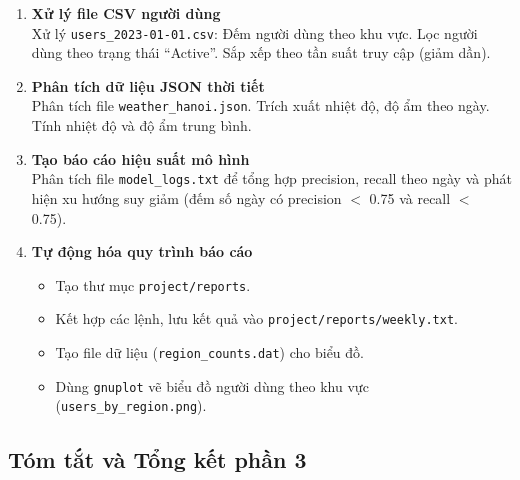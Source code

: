 \documentclass[11pt]{article}
\begin{document}
\begin{enumerate}
	\item \textbf{Xử lý file CSV người dùng}\\
	Xử lý \texttt{users\_2023-01-01.csv}: Đếm người dùng theo khu vực. Lọc người dùng theo trạng thái ``Active''. Sắp xếp theo tần suất truy cập (giảm dần).

	\item \textbf{Phân tích dữ liệu JSON thời tiết}\\
	Phân tích file \texttt{weather\_hanoi.json}. Trích xuất nhiệt độ, độ ẩm theo ngày. Tính nhiệt độ và độ ẩm trung bình.

	\item \textbf{Tạo báo cáo hiệu suất mô hình}\\
	Phân tích file \texttt{model\_logs.txt} để tổng hợp precision, recall theo ngày và phát hiện xu hướng suy giảm (đếm số ngày có precision $<$ 0.75 và recall $<$ 0.75).

	\item \textbf{Tự động hóa quy trình báo cáo}
	\begin{itemize}
		\item Tạo thư mục \texttt{project/reports}.
		\item Kết hợp các lệnh, lưu kết quả vào \texttt{project/reports/weekly.txt}.
		\item Tạo file dữ liệu (\texttt{region\_counts.dat}) cho biểu đồ.
		\item Dùng \texttt{gnuplot} vẽ biểu đồ người dùng theo khu vực (\texttt{users\_by\_region.png}).
	\end{itemize}
\end{enumerate}

\subsection{Tóm tắt và Tổng kết phần 3}
\end{document}
